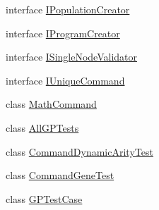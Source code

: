\begin{DoxyCompactItemize}
interface \hyperlink{interfaceorg_1_1jgap_1_1gp_1_1_i_population_creator}{I\-Population\-Creator}
\item 
interface \hyperlink{interfaceorg_1_1jgap_1_1gp_1_1_i_program_creator}{I\-Program\-Creator}
\item 
interface \hyperlink{interfaceorg_1_1jgap_1_1gp_1_1_i_single_node_validator}{I\-Single\-Node\-Validator}
\item 
interface \hyperlink{interfaceorg_1_1jgap_1_1gp_1_1_i_unique_command}{I\-Unique\-Command}
\item 
class \hyperlink{classorg_1_1jgap_1_1gp_1_1_math_command}{Math\-Command}
\item 
class \hyperlink{classorg_1_1jgap_1_1gp_1_1_all_g_p_tests}{All\-G\-P\-Tests}
\item 
class \hyperlink{classorg_1_1jgap_1_1gp_1_1_command_dynamic_arity_test}{Command\-Dynamic\-Arity\-Test}
\item 
class \hyperlink{classorg_1_1jgap_1_1gp_1_1_command_gene_test}{Command\-Gene\-Test}
\item 
class \hyperlink{classorg_1_1jgap_1_1gp_1_1_g_p_test_case}{G\-P\-Test\-Case}
\end{DoxyCompactItemize}
